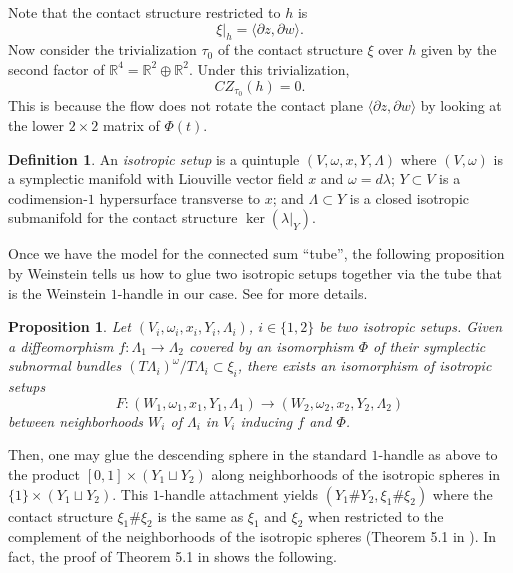 \documentclass{article}
\numberwithin{equation}{section}
\newtheorem{proposition}[theorem]{Proposition}
\theoremstyle{definition}
\newtheorem{definition}[theorem]{Definition}
\newcommand{\R}{\mathbb{R}}
\begin{document}
Note that the contact structure restricted to $h$ is $$\xi|_{h} = \langle \partial z, \partial w\rangle.$$
Now consider the trivialization $\tau_0$ of the contact structure $\xi$ over $h$ given by the second factor of $\R^4 = \R^2 \oplus \R^2$. Under this trivialization,
$$CZ_{\tau_0}(h) = 0.$$
This is because the flow does not rotate the contact plane $\langle \partial z, \partial w\rangle$ by looking at the lower $2\times 2$ matrix of $\Phi(t)$.


\begin{definition}
    An \emph{isotropic setup} is a quintuple $(V, \omega, x, Y, \Lambda)$ where $(V, \omega)$ is a symplectic manifold with Liouville vector field $x$ and $\omega = d\lambda$; $Y \subset V$ is a codimension-$1$ hypersurface transverse to $x$; and $\Lambda \subset Y$ is a closed isotropic submanifold for the contact structure $\ker(\lambda|_{Y})$.
\end{definition}

Once we have the model for the connected sum ``tube'', the following proposition by Weinstein tells us how to glue two isotropic setups together via the tube that is the Weinstein $1$-handle in our case. See \cite{Weinstein_one_handle, Cieliebak_Eliashberg} for more details.


\begin{proposition}\cite[Proposition 4.2]{Weinstein_one_handle}
\label{prop:isotropic_setup}
    Let $(V_i, \omega_i, x_i, Y_i, \Lambda_i)$, $i\in \{1,2\}$ be two isotropic setups. Given a diffeomorphism $f:\Lambda_1 \to \Lambda_2$ covered by an isomorphism $\Phi$ of their symplectic subnormal bundles $(T\Lambda_i)^\omega/T\Lambda_i\subset \xi_i$, there exists an isomorphism of isotropic setups
    $$F: (W_1, \omega_1, x_1, Y_1, \Lambda_1) \longrightarrow (W_2, \omega_2, x_2, Y_2, \Lambda_2)$$
    between neighborhoods $W_i$ of $\Lambda_i$ in $V_i$ inducing $f$ and $\Phi$.
\end{proposition}

Then, one may glue the descending sphere in the standard $1$-handle as above to the product $[0,1] \times (Y_1 \sqcup Y_2)$ along neighborhoods of the isotropic spheres in $\{1\}\times (Y_1 \sqcup Y_2)$. This $1$-handle attachment yields $(Y_1\# Y_2, \xi_1 \# \xi_2)$ where the contact structure $\xi_1 \# \xi_2$ is the same as $\xi_1$ and $\xi_2$ when restricted to the complement of the neighborhoods of the isotropic spheres (Theorem 5.1 in \cite{Weinstein_one_handle}). In fact, the proof of Theorem 5.1 in \cite{Weinstein_one_handle} shows the following.
\end{document}

